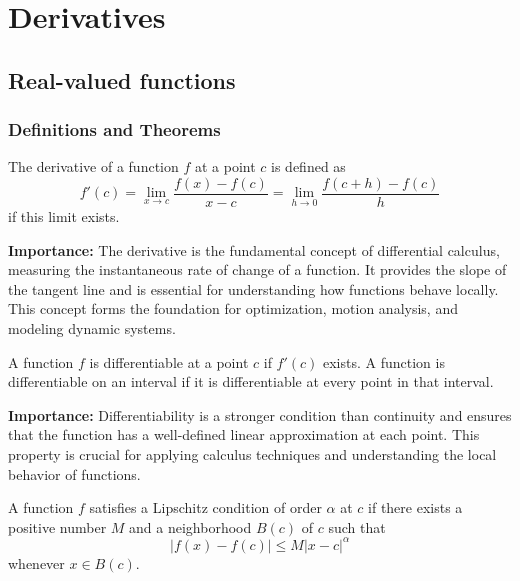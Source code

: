 \chapter{Derivatives}

\section{Real-valued functions}

\subsection*{Definitions and Theorems}

\begin{definition}[Derivative]
The derivative of a function $f$ at a point $c$ is defined as
\[ f'(c) = \lim_{x \to c} \frac{f(x) - f(c)}{x - c} = \lim_{h \to 0} \frac{f(c + h) - f(c)}{h} \]
if this limit exists.
\end{definition}

\noindent\textbf{Importance:} The derivative is the fundamental concept of differential calculus, measuring the instantaneous rate of change of a function. It provides the slope of the tangent line and is essential for understanding how functions behave locally. This concept forms the foundation for optimization, motion analysis, and modeling dynamic systems.



\begin{definition}
A function $f$ is differentiable at a point $c$ if $f'(c)$ exists. A function is differentiable on an interval if it is differentiable at every point in that interval.
\end{definition}

\noindent\textbf{Importance:} Differentiability is a stronger condition than continuity and ensures that the function has a well-defined linear approximation at each point. This property is crucial for applying calculus techniques and understanding the local behavior of functions.



\begin{definition}
A function $f$ satisfies a Lipschitz condition of order $\alpha$ at $c$ if there exists a positive number $M$ and a neighborhood $B(c)$ of $c$ such that
\[ |f(x) - f(c)| \leq M|x - c|^\alpha \]
whenever $x \in B(c)$.
\end{definition}

